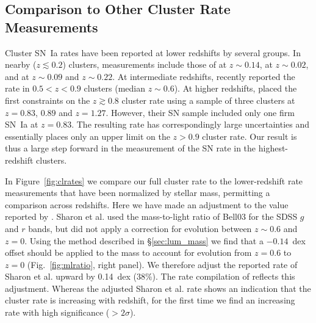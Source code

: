 \subsection{Comparison to Other Cluster Rate Measurements}

Cluster SN~Ia rates have been reported at lower redshifts by several
groups. In nearby ($z \lesssim 0.2$) clusters, measurements include
those of \citet{sharon07a} at $z \sim 0.14$, \citet{mannucci08a} at $z
\sim 0.02$, and \citet{dilday10a} at $z \sim 0.09$ and $z \sim 0.22$.
At intermediate redshifts, \citet{sharon10a} recently reported
the rate in $0.5 < z < 0.9$ clusters (median $z \sim 0.6$). At higher
redshifts, \citet{galyam02a} placed the first constraints on the $z
\gtrsim 0.8$ cluster rate using a sample of three clusters at
$z=0.83$, $0.89$ and $z=1.27$.  However, their SN sample included only
one firm SN~Ia at $z=0.83$. The resulting rate has correspondingly
large uncertainties and essentially places only an upper limit on the
$z>0.9$ cluster rate. Our result is thus a large step forward in the
measurement of the SN rate in the highest-redshift clusters.

In Figure~\ref{fig:clrates} we compare our full cluster rate to the
lower-redshift rate measurements that have been normalized by stellar
mass, permitting a comparison across redshifts. Here we have made an
adjustment to the value reported by \citet{sharon10a}. Sharon et
al. used the mass-to-light ratio of Bell03 for the SDSS $g$ and $r$
bands, but did not apply a correction for evolution between $z \sim
0.6$ and $z = 0$.  Using the method described in \S\ref{sec:lum_mass} we
find that a $-0.14$~dex offset should be applied to the mass to
account for evolution from $z=0.6$ to $z=0$ (Fig.~\ref{fig:mlratio},
right panel). We therefore adjust the reported rate of Sharon et
al. upward by 0.14~dex ($38\%$). The rate compilation of \citet{maoz10c}
reflects this adjustment. Whereas the adjusted Sharon et al. rate
shows an indication that the cluster rate is increasing with redshift,
for the first time we find an increasing rate with high significance
($>2\sigma$).


